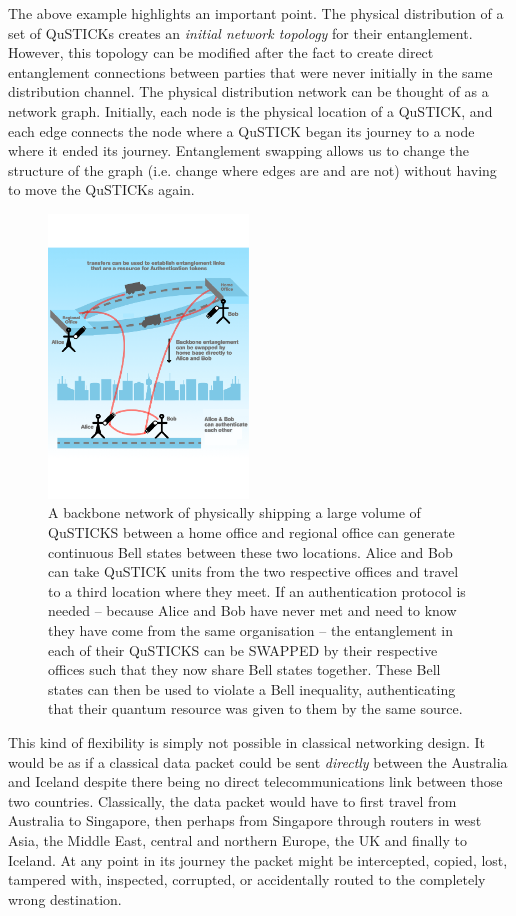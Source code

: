 \documentclass[twocolumn, aps, rmp, amsmath, amssymb, nofootinbib, superscriptaddress, longbibliography, floatfix, table-of-contents, eqsecnum]{revtex4-2}
\begin{document}
The above example highlights an important point. The physical distribution of a set of QuSTICKs creates an \textit{initial network topology} for their entanglement. However, this topology can be modified after the fact to create direct entanglement connections between parties that were never initially in the same distribution channel. The physical distribution network can be thought of as a network graph. Initially, each node is the physical location of a QuSTICK, and each edge connects the node where a QuSTICK began its journey to a node where it ended its journey. Entanglement swapping allows us to change the structure of the graph (i.e. change where edges are and are not) without having to move the QuSTICKs again. 
 
\begin{figure}[htbp!]
	\includegraphics[clip=true, width=0.475\textwidth]{swapping}
	\caption{A backbone network of physically shipping a large volume of QuSTICKS between a home office and regional office can generate continuous Bell states between these two locations.  Alice and Bob can take QuSTICK units from the two respective offices and travel to a third location where they meet.  If an authentication protocol is needed -- because Alice and Bob have never met and need to know they have come from the same organisation -- the entanglement in each of their QuSTICKS can be SWAPPED by their respective offices such that they now share Bell states together.  These Bell states can then be used to violate a Bell inequality, authenticating that their quantum resource was given to them by the same source.} \label{fig:SWAPPING}
\end{figure}

This kind of flexibility is simply not possible in classical networking design. It would be as if a classical data packet could be sent \textit{directly} between the Australia and Iceland despite there being no direct telecommunications link between those two countries. Classically, the data packet would have to first travel from Australia to Singapore, then perhaps from Singapore through routers in west Asia, the Middle East, central and northern Europe, the UK and finally to Iceland. At any point in its journey the packet might be intercepted, copied, lost, tampered with, inspected, corrupted, or accidentally routed to the completely wrong destination. 
\end{document}
